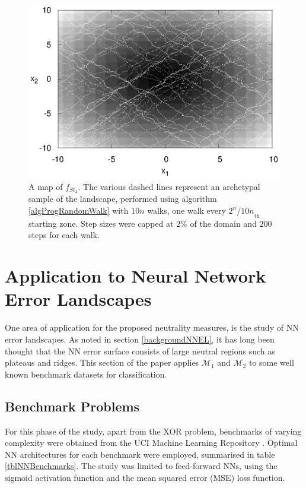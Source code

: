 \documentclass[conference]{IEEEtran}
\begin{document}
\begin{figure}[!ht]
	\centering
	\includegraphics[width=\linewidth]{step2Sampled}%
		
	\caption{A map of $f_{\textit{St}_2}$. The various dashed lines represent an archetypal sample of the landscape, performed using algorithm \ref{algProgRandomWalk} with $10n$ walks, one walk every ${2^n/10n}_{\text{th}}$ starting zone. Step sizes were capped at $2\%$ of the domain and $200$ steps for each walk.}
	\label{figStep2Sampled}
\end{figure}

\section{Application to Neural Network Error Landscapes}
\label{nnELApplication}
One area of application for the proposed neutrality measures, is the study of NN error landscapes. As noted in section \ref{backgroundNNEL}, it has long been thought that the NN error surface consists of large neutral regions such as plateaus and ridges. This section of the paper applies ${\mathcal{M}_1}$ and ${\mathcal{M}_2}$ to some well known benchmark datasets for classification.

\subsection{Benchmark Problems}
\label{nnBenchmarks}
For this phase of the study, apart from the XOR problem, benchmarks of varying complexity were obtained from the UCI Machine Learning Repository \cite{Lichman2013}. Optimal NN architectures for each benchmark were employed, summarised in table \ref{tblNNBenchmarks}. The study was limited to feed-forward NNs, using the sigmoid activation function and the mean squared error (MSE) loss function.
\end{document}
